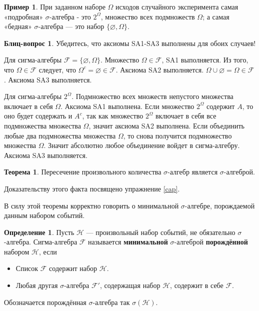 \documentclass[pdftex, 12pt, a4paper]{article}
\def\F{\ensuremath{\mathcal{F}}} %
\def \Om{\Omega}
\theoremstyle{definition} %
\newtheorem*{mydef}{Определение}
\newtheorem{myex}{Пример}
\newtheorem{myth}{Теорема}
\numberwithin{problem}{section}
\newcommand{\indef}[1]{\textbf{#1}}
\newtheorem{blits}{Блиц-вопрос}
\numberwithin{blits}{section}
\begin{document}
\begin{myex} При заданном наборе $\Omega$ исходов случайного эксперимента самая «подробная» $\sigma$-алгебра - это $2^{\Omega}$, множество всех подмножеств $\Omega$; а самая «бедная» $\sigma$-алгебра --- это набор $\{\varnothing,\Omega\}$.

\begin{blits}
Убедитесь, что аксиомы SA1-SA3 выполнены для обоих случаев!
\begin{blitssol}
Для сигма-алгебры $\F = \{\varnothing, \Om \}$. Множество $\Om \in \F$, SA1 выполняется. Из того, что $\Om \in \F$ следует, что $\Om^c = \varnothing \in \F$. Аксиома SA2 выполняется. $\Om \cup \varnothing = \Om \in \F$. Аксиома SA3 выполняется.

Для сигма-алгебры $2^{\Om}$. Подмножество всех множеств непустого множества включает в себя $\Om$. Аксиома SA1 выполнена. Если множество $2^{\Om}$ содержит $A$, то оно будет содержать и $A^c$, так как  множество $2^{\Om}$ включает в себя все подмножества множества $\Om$, значит аксиома SA2 выполнена. Если объединить любые два подмножества множества $\Om$, то снова получится подмножество множества $\Om$. Значит абсолютно любое объединение войдет в сигма-алгебру. Аксиома SA3 выполняется.
\end{blitssol}
\end{blits}
\end{myex}


\begin{myth} Пересечение произвольного количества $\sigma$-алгебр является $\sigma$-алгеброй.
\end{myth}

Доказательству этого факта посвящено упражнение \ref{cap}. 

В силу этой теоремы корректно говорить о минимальной $\sigma$-алгебре, порождаемой данным набором событий.

\begin{mydef} Пусть $\mathcal{H}$ --- произвольный набор событий, не обязательно $\sigma$-алгебра. Сигма-алгебра $\mathcal{F}$ называется \indef{минимальной} $\sigma$-алгеброй \indef{порождённой}  набором $\mathcal{H}$, если

\begin{itemize}
\item Список $\mathcal{F}$ содержит набор $\mathcal{H}$.

\item Любая другая $\sigma$-алгебра $\mathcal{F}'$, содержащая набор $\mathcal{H}$, содержит в себе $\mathcal{F}$.
\end{itemize}
 Обозначается порождённая $\sigma$-алгебра так $\sigma(\mathcal{H})$.
\end{mydef}
\end{document}
